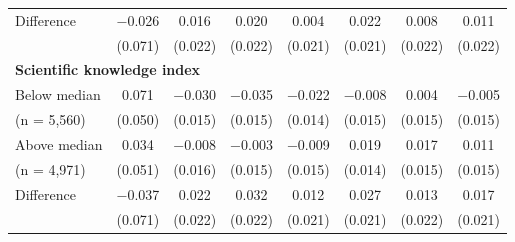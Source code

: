 \begin{tabular}[t]{lccccccc}
\hspace{1em}  Difference & \num{-0.026} & \num{0.016} & \num{0.020} & \num{0.004} & \num{0.022} & \num{0.008} & \num{0.011}\\
\hspace{2em} & (\num{0.071}) & (\num{0.022}) & (\num{0.022}) & (\num{0.021}) & (\num{0.021}) & (\num{0.022}) & (\num{0.022})\\\multicolumn{4}{l}{\textbf{Scientific knowledge index}} \rule{0pt}{1.2\normalbaselineskip}\\
\hspace{1em} Below median & \num{0.071} & \num{-0.030} & \num{-0.035} & \num{-0.022} & \num{-0.008} & \num{0.004} & \num{-0.005}\\
\hspace{2em}(n = 5,560) & (\num{0.050}) & (\num{0.015}) & (\num{0.015}) & (\num{0.014}) & (\num{0.015}) & (\num{0.015}) & (\num{0.015})\\
\hspace{1em} Above median & \num{0.034} & \num{-0.008} & \num{-0.003} & \num{-0.009} & \num{0.019} & \num{0.017} & \num{0.011}\\
\hspace{2em}(n = 4,971) & (\num{0.051}) & (\num{0.016}) & (\num{0.015}) & (\num{0.015}) & (\num{0.014}) & (\num{0.015}) & (\num{0.015})\\\cmidrule(lr){2-8}
\hspace{1em} Difference & \num{-0.037} & \num{0.022} & \num{0.032} & \num{0.012} & \num{0.027} & \num{0.013} & \num{0.017}\\
\hspace{2em} & (\num{0.071}) & (\num{0.022}) & (\num{0.022}) & (\num{0.021}) & (\num{0.021}) & (\num{0.022}) & (\num{0.021})\\
\end{tabular}
